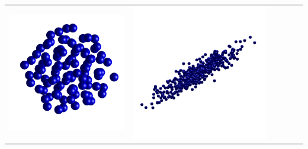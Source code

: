 \begin{teaserfigure}
\begin{tabular}{cccccc}
        \includegraphics[height=\resLen]{images/particle/500nm_N100.png} &
        \includegraphics[height=\resLen]{images/particle/aniso.png} &

\end{tabular}
\end{teaserfigure}
